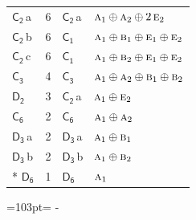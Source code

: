 \documentclass[10pt,a4paper]{article}
\newcommand{\needspace}[1]{\par\penalty-100\begingroup\dimen0=#1\relax\dimen2=\pagegoal
  \advance\dimen2-\pagetotal\ifdim\dimen0>\dimen2\relax\ifdim\dimen2>0pt\vfil\break\fi\fi
  \endgroup}
\numberwithin{equation}{section}
\newcommand{\grp}[1]{\mathsf{#1}}
\newcommand{\irr}[1]{\text{\normalfont\scshape #1}}
\newcommand{\clsletter}[1]{\,{\scriptsize\color{black!55}#1}}
\newlength{\fillwidth}\newlength{\cellwidth}\newlength{\colwidth}
\begin{document}
{\begin{longtable}{@{}lrl>{\RaggedRight\arraybackslash}p{\fillwidth}@{}}
\href{C2.pdf}{$\grp{C_{2}}$}\clsletter{a} & 6 & \href{C2.pdf}{$\grp{C_{2}}$}\clsletter{a} & $\irr{a}_{1}\oplus \irr{a}_{2}\oplus 2\,\irr{e}_{2}$\\
\href{C2.pdf}{$\grp{C_{2}}$}\clsletter{b} & 6 & \href{C1.pdf}{$\grp{C_{1}}$} & $\irr{a}_{1}\oplus \irr{b}_{1}\oplus \irr{e}_{1}\oplus \irr{e}_{2}$\\
\href{C2.pdf}{$\grp{C_{2}}$}\clsletter{c} & 6 & \href{C1.pdf}{$\grp{C_{1}}$} & $\irr{a}_{1}\oplus \irr{b}_{2}\oplus \irr{e}_{1}\oplus \irr{e}_{2}$\\
\href{C3.pdf}{$\grp{C_{3}}$} & 4 & \href{C3.pdf}{$\grp{C_{3}}$} & $\irr{a}_{1}\oplus \irr{a}_{2}\oplus \irr{b}_{1}\oplus \irr{b}_{2}$\\
\href{D2.pdf}{$\grp{D_{2}}$} & 3 & \href{C2.pdf}{$\grp{C_{2}}$}\clsletter{a} & $\irr{a}_{1}\oplus \irr{e}_{2}$\\
\href{C6.pdf}{$\grp{C_{6}}$} & 2 & \href{C6.pdf}{$\grp{C_{6}}$} & $\irr{a}_{1}\oplus \irr{a}_{2}$\\
\href{D3.pdf}{$\grp{D_{3}}$}\clsletter{a} & 2 & \href{D3.pdf}{$\grp{D_{3}}$}\clsletter{a} & $\irr{a}_{1}\oplus \irr{b}_{1}$\\
\href{D3.pdf}{$\grp{D_{3}}$}\clsletter{b} & 2 & \href{D3.pdf}{$\grp{D_{3}}$}\clsletter{b} & $\irr{a}_{1}\oplus \irr{b}_{2}$\\*
\href{D6.pdf}{$\grp{D_{6}}$} & 1 & \href{D6.pdf}{$\grp{D_{6}}$} & $\irr{a}_{1}$\\
\bottomrule\end{longtable}}
\needspace{103pt}
\end{document}
